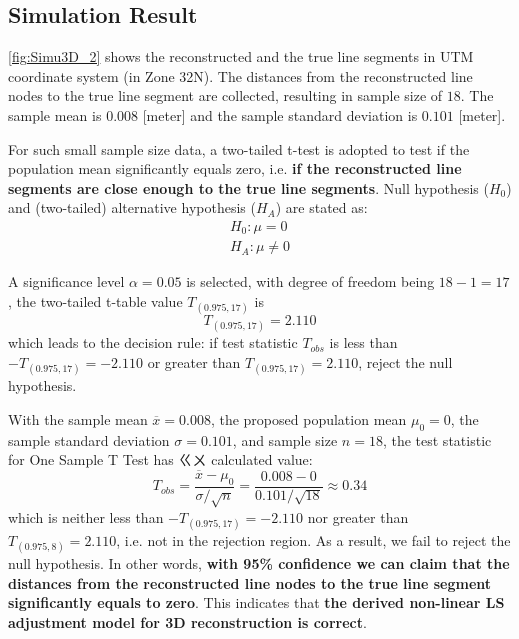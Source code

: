 \subsection{Simulation Result}
\label{subsec:simuresult}



\cref{fig:Simu3D_2} shows the reconstructed and the true line segments in UTM coordinate system (in Zone 32N). The distances from the reconstructed line nodes to the true line segment are collected, resulting in sample size of $18$. The sample mean is $0.008$ [meter] and the sample standard deviation is $0.101$ [meter]. %

For such small sample size data, a two-tailed t-test is adopted to test if the population mean significantly equals zero, i.e. \textbf{if the reconstructed line segments are close enough to the true line segments}. Null hypothesis ($H_0$) and (two-tailed) alternative hypothesis ($H_A$) are stated as:
\begin{equation*}
\begin{split}
H_0: \mu=0\\
H_A: \mu\neq0
\end{split}
\end{equation*}

A significance level $\alpha=0.05$ is selected, with degree of freedom being $18-1=17$, the two-tailed t-table value $T_{(0.975,17)}$ is
\begin{equation*}
T_{(0.975,17)}=2.110
\end{equation*}
which leads to the decision rule: if test statistic $T_{obs}$ is less than $-T_{(0.975,17)}=-2.110$ or greater than $T_{(0.975,17)}=2.110$, reject the null hypothesis.

With the sample mean $\overline{x}=0.008$,
the proposed population mean $\mu_0=0$,
the sample standard deviation $\sigma=0.101$,
and sample size $n=18$, the test statistic for One Sample T Test has ㄍㄨ calculated value:
\begin{equation*}
T_{obs} = \frac{\overline{x}-\mu_0}{\sigma/\sqrt{n}}=\frac{0.008-0}{0.101/\sqrt{18}}\approx0.34
\end{equation*}
which is neither less than $-T_{(0.975,17)}=-2.110$ nor greater than $T_{(0.975,8)}=2.110$, i.e. not in the rejection region. As a result, we fail to reject the null hypothesis. In other words, \textbf{with 95\% confidence we can claim that the distances from the reconstructed line nodes to the true line segment significantly equals to zero}. This indicates that \textbf{the derived non-linear LS adjustment model for 3D reconstruction is correct}.


